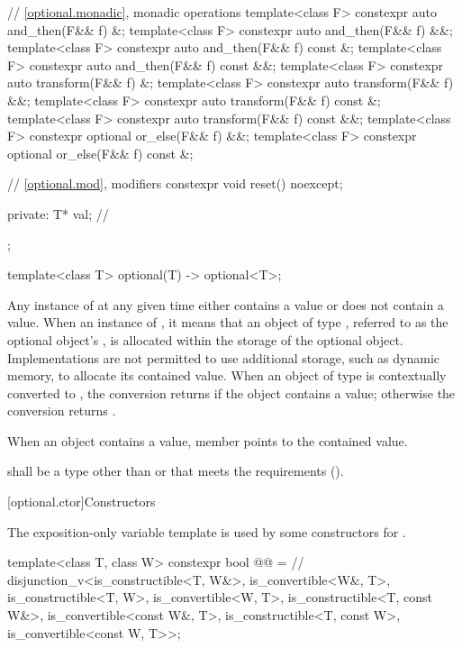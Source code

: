 \begin{codeblock}
{{    // \ref{optional.monadic}, monadic operations
    template<class F> constexpr auto and_then(F&& f) &;
    template<class F> constexpr auto and_then(F&& f) &&;
    template<class F> constexpr auto and_then(F&& f) const &;
    template<class F> constexpr auto and_then(F&& f) const &&;
    template<class F> constexpr auto transform(F&& f) &;
    template<class F> constexpr auto transform(F&& f) &&;
    template<class F> constexpr auto transform(F&& f) const &;
    template<class F> constexpr auto transform(F&& f) const &&;
    template<class F> constexpr optional or_else(F&& f) &&;
    template<class F> constexpr optional or_else(F&& f) const &;

    // \ref{optional.mod}, modifiers
    constexpr void reset() noexcept;

  private:
    T* val;         // \expos
  };

  template<class T>
    optional(T) -> optional<T>;
}
\end{codeblock}

\pnum
Any instance of  at any given time either contains a value or does not contain a value.
When an instance of  ,
it means that an object of type , referred to as the optional object's ,
is allocated within the storage of the optional object.
Implementations are not permitted to use additional storage, such as dynamic memory, to allocate its contained value.
When an object of type  is contextually converted to ,
the conversion returns  if the object contains a value;
otherwise the conversion returns .

\pnum
When an  object contains a value,
member  points to the contained value.

\pnum
{} shall be a type
other than \cv{}  or \cv{} 
that meets the  requirements ().

[optional.ctor]{Constructors}

\pnum
The exposition-only variable template 
is used by some constructors for .
\begin{codeblock}
template<class T, class W>
constexpr bool @@ =  // \expos
  disjunction_v<is_constructible<T, W&>, is_convertible<W&, T>,
                is_constructible<T, W>, is_convertible<W, T>,
                is_constructible<T, const W&>, is_convertible<const W&, T>,
                is_constructible<T, const W>, is_convertible<const W, T>>;
\end{codeblock}

